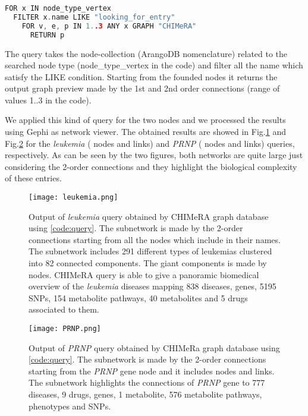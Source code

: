 \documentclass{standalone}
\begin{document}
\lstset{style=Java}
\begin{lstlisting}[language=C++, caption=DNetPRO signature extraction, label=code:query]
FOR x IN node_type_vertex
  FILTER x.name LIKE "looking_for_entry"
    FOR v, e, p IN 1..3 ANY x GRAPH "CHIMeRA"
      RETURN p
\end{lstlisting}

The query takes the node-collection (\textsf{ArangoDB} nomenclature) related to the searched node type (\textsf{node\_type\_vertex} in the code) and filter all the name which satisfy the \textsf{LIKE} condition.
Starting from the founded nodes it returns the output graph preview made by the 1st and 2nd order connections (range of values \textsf{1..3} in the code).

We applied this kind of query for the two nodes and we processed the results using \textsf{Gephi} as network viewer.
The obtained results are showed in Fig.\ref{fig:leukemia} and Fig.\ref{fig:prnp} for the \emph{leukemia} ( nodes and  links) and \emph{PRNP} ( nodes and  links) queries, respectively.
As can be seen by the two figures, both networks are quite large just considering the 2-order connections and they highlight the biological complexity of these entries.

\begin{figure}[htbp]
\centering
\texttt{[image: leukemia.png]}
\caption{Output of \emph{leukemia} query obtained by \textsf{CHIMeRA} graph database using \ref{code:query}.
The subnetwork is made by the 2-order connections starting from all the nodes which include  in their names.
The subnetwork includes 291 different types of leukemias clustered into 82 connected components.
The giant components is made by  nodes.
\textsf{CHIMeRA} query is able to give a panoramic biomedical overview of the \emph{leukemia} diseases mapping 838 diseases,  genes, 5195 SNPs, 154 metabolite pathways, 40 metabolites and 5 drugs associated to them.
}
\label{fig:leukemia}
\end{figure}

\begin{figure}[htbp]
\centering
\texttt{[image: PRNP.png]}
\caption{Output of \emph{PRNP} query obtained by \textsf{CHIMeRa} graph database using \ref{code:query}.
The subnetwork is made by the 2-order connections starting from the \emph{PRNP} gene node and it includes  nodes and  links.
The subnetwork highlights the connections of \emph{PRNP} gene to 777 diseases, 9 drugs,  genes, 1 metabolite, 576 metabolite pathways,  phenotypes and  SNPs.
}
\label{fig:prnp}
\end{figure}
\end{document}
